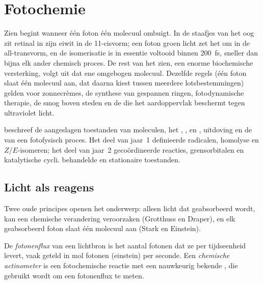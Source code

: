 \chapter{Fotochemie}\label{ch:b3:photochemistry}

Zien begint wanneer één foton één molecuul ombuigt. In de staafjes van het
oog zit retinal in zijn eiwit in de 11-cisvorm; een foton groen licht zet
het om in de all-transvorm, en de isomerisatie is in essentie voltooid
binnen \qty{200}{fs}, sneller dan bijna elk ander chemisch proces. De rest
van het zien, een enorme biochemische versterking, volgt uit dat ene
omgebogen molecuul. Dezelfde regels (één foton slaat één molecuul aan, dat
daarna kiest tussen meerdere lotsbestemmingen) gelden voor zonnecrèmes,
de synthese van gespannen ringen, fotodynamische therapie, de smog boven
steden en de  die het aardoppervlak beschermt tegen ultraviolet
licht.

\begin{recall}
 beschreef de aangeslagen toestanden
van moleculen, het , , 
en , uitdoving en de  van een fotofysisch
proces. Het deel van jaar~1 definieerde radicalen, homolyse en
$Z$/$E$-isomeren; het deel van jaar~2
gecoördineerde reacties, grensorbitalen en katalytische cycli.
 behandelde  en stationaire
toestanden.
\end{recall}

\section{Licht als reagens}

Twee oude principes openen het onderwerp: alleen licht dat geabsorbeerd
wordt, kan een chemische verandering veroorzaken (Grotthuss en Draper), en
elk geabsorbeerd foton slaat één molecuul aan (Stark en Einstein).

\begin{definition}\label{def:b3:photochemistry:photon-flux}
De \emph{fotonenflux} van een lichtbron is het aantal
fotonen dat ze per tijdseenheid levert, vaak geteld in mol fotonen
(einstein) per seconde. Een
\emph{chemische actinometer} is een
fotochemische reactie met een nauwkeurig bekende , die
gebruikt wordt om een fotonenflux te meten.
\end{definition}

